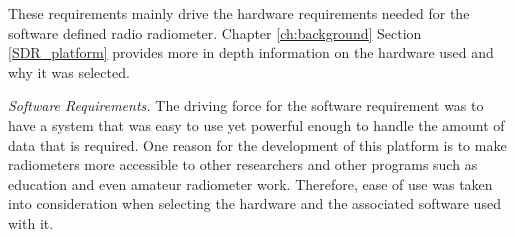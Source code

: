 These requirements mainly drive the hardware requirements needed for the software defined radio radiometer.  Chapter \ref{ch:background} Section \ref{SDR_platform} provides more in depth information on the hardware used and why it was selected.






\emph{Software Requirements.}  The driving force for the software requirement was to have a system that was easy to use yet powerful enough to handle the amount of data that is required.  One reason for the development of this platform is to make radiometers more accessible to other researchers and other programs such as education and even amateur radiometer work.  Therefore, ease of use was taken into consideration when selecting the hardware and the associated software used with it.

